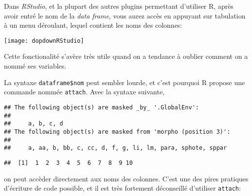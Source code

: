 Dans \emph{RStudio}, et la plupart des autres plugins permettant d'utiliser R, après avoir entré le nom de la \emph{data frame}, vous aurez accès en appuyant sur tabulation à un menu déroulant,
lequel contient les noms des colonnes: 

\begin{center}
\texttt{[image: dopdownRStudio]}
\end{center}

Cette fonctionalité s'avère très utile quand on a tendance à oublier comment on a nommé ses variables.

La syntaxe \texttt{dataframe\$nom} peut sembler lourde, et c'est pourquoi R propose une commande nommée \texttt{attach}.
Avec la syntaxe suivante,

\begin{knitrout}
\color{fgcolor}\begin{kframe}
\begin{flushleft}
\ttfamily\noindent
{}\hlkeyword{(}\hlkeyword{)}\mbox{}
\normalfont
\end{flushleft}
\begin{verbatim}
## The following object(s) are masked _by_ '.GlobalEnv':
## 
##     a, b, c, d
## The following object(s) are masked from 'morpho (position 3)':
## 
##     a, aa, b, bb, c, cc, d, f, g, li, lm, para, sphote, sppar
\end{verbatim}
\begin{flushleft}
\ttfamily\noindent
{}\mbox{}
\normalfont
\end{flushleft}
\begin{verbatim}
##  [1]  1  2  3  4  5  6  7  8  9 10
\end{verbatim}
\begin{flushleft}
\ttfamily\noindent
{}\hlkeyword{(}\hlkeyword{)}\mbox{}
\normalfont
\end{flushleft}
\end{kframe}
\end{knitrout}


\noindent on peut accèder directement aux noms des colonnes.
C'est une des pires pratiques d'écriture de code possible, et il est très fortement déconseillé d'utiliser \texttt{attach}:

